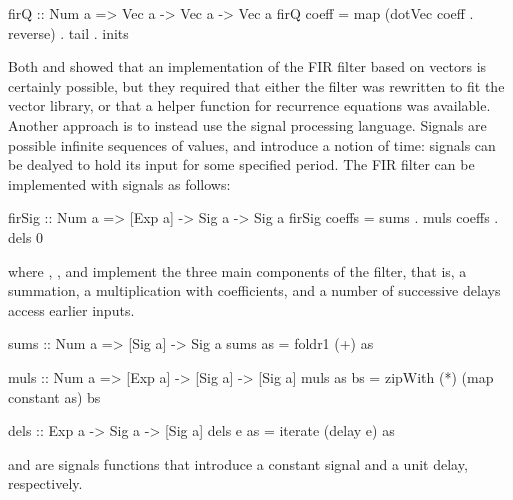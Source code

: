 \documentclass[../paper.tex]{subfiles}
\begin{document}
\begin{code}
firQ :: Num a => Vec a -> Vec a -> Vec a
firQ coeff = map (dotVec coeff . reverse) . tail . inits
\end{code}


Both  and  showed that an implementation of the FIR filter based on vectors is certainly possible, but they required that either the filter was rewritten to fit the vector library, or that a helper function for recurrence equations was available. Another approach is to instead use the signal processing language. Signals are possible infinite sequences of values, and introduce a notion of time: signals can be dealyed to hold its input for some specified period. The FIR filter can be implemented with signals as follows:

\begin{code}
firSig :: Num a => [Exp a] -> Sig a -> Sig a
firSig coeffs = sums . muls coeffs . dels 0
\end{code}

\noindent where , , and  implement the three main components of the filter, that is, a summation, a multiplication with coefficients, and a number of successive delays access earlier inputs.

\begin{code}
sums :: Num a => [Sig a] -> Sig a
sums as = foldr1 (+) as

muls :: Num a => [Exp a] -> [Sig a] -> [Sig a]
muls as bs = zipWith (*) (map constant as) bs

dels :: Exp a -> Sig a -> [Sig a]
dels e as = iterate (delay e) as
\end{code}

\noindent {} and  are signals functions that introduce a constant signal and a unit delay, respectively.

\end{document}
